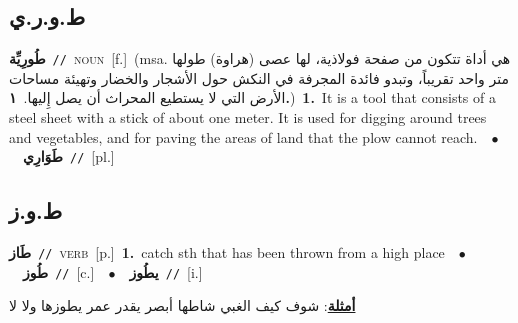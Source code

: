 \documentclass[10pt,a4paper,twoside]{article} %
\begin{document}
\begin{multicols}{2}
\vspace{-3mm}
\subsection*{\color{blue}\foreignlanguage{arabic}{ط.و.ر.ي}\color{blue}{}} 

{\setlength\topsep{0pt}\textbf{\foreignlanguage{arabic}{طُورِيِّة}}\ {\color{gray}\texttt{//}\color{black}}\ \textsc{noun}\ [f.]\ \color{gray}(msa. \foreignlanguage{arabic}{هي أداة تتكون من صفحة فولاذية، لها عصى (هراوة) طولها متر واحد تقريباً، وتبدو فائدة المجرفة في النكش حول الأشجار والخضار وتهيئة مساحات الأرض التي لا يستطيع المحراث أن يصل إِليها.}~\foreignlanguage{arabic}{\textbf{١.}})\color{black}\ \textbf{1.}~It is a tool that consists of a steel sheet with a stick of about one meter. It is used for digging around trees and vegetables, and for paving the areas of land that the plow cannot reach.\ \ $\bullet$\ \ \setlength\topsep{0pt}\textbf{\foreignlanguage{arabic}{طَوَارِي}}\ {\color{gray}\texttt{//}\color{black}}\ [pl.]\ } \vspace{2mm}

\vspace{-3mm}
\subsection*{\color{blue}\foreignlanguage{arabic}{ط.و.ز}\color{blue}{}} 

{\setlength\topsep{0pt}\textbf{\foreignlanguage{arabic}{طَاز}}\ {\color{gray}\texttt{//}\color{black}}\ \textsc{verb}\ [p.]\ \textbf{1.}~catch sth that has been thrown from a high place\ \ $\bullet$\ \ \setlength\topsep{0pt}\textbf{\foreignlanguage{arabic}{طُوز}}\ {\color{gray}\texttt{//}\color{black}}\ [c.]\ \ $\bullet$\ \ \setlength\topsep{0pt}\textbf{\foreignlanguage{arabic}{يطُوز}}\ {\color{gray}\texttt{//}\color{black}}\ [i.]\  \begin{flushright}\color{gray}\foreignlanguage{arabic}{\textbf{\underline{\foreignlanguage{arabic}{أمثلة}}}: شوف كيف الغبي شاطها أبصر يقدر عمر يطوزها ولا لا}\end{flushright}\color{black}} \vspace{2mm}


\end{multicols}
\end{document}
